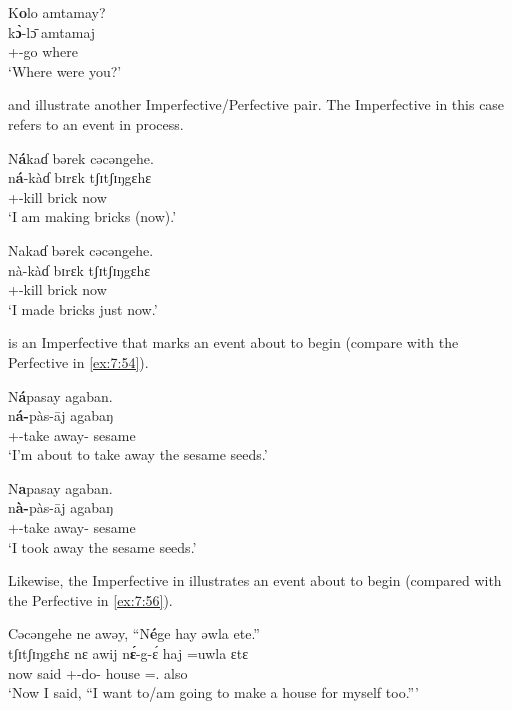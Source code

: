 \clearpage
\ea\label{ex:7:50}
K\textbf{o}lo  amtamay?\\
\gll k\textbf{\`ɔ}{}-l\=ɔ  amtamaj\\
{\twoS}+{\PFV}-go  where\\
\glt ‘Where were you?’
\z

 and  illustrate another Imperfective/Perfective pair. The Imperfective in this case refers to an event in process. 

\ea\label{ex:7:51}
N\textbf{á}kaɗ  bərek  cəcəngehe.\\
\gll n\textbf{á}-kàɗ  bɪrɛk  tʃɪtʃɪŋgɛhɛ\\
{\oneS}+{\IFV}-kill  brick  now\\
\glt ‘I am making bricks (now).’ 
\z

\ea\label{ex:7:52}
Nakaɗ  bərek  cəcəngehe.\\
\gll nà-kàɗ  bɪrɛk  tʃɪtʃɪŋgɛhɛ\\
{\oneS}+{\PFV}-kill  brick  now\\
\glt ‘I made bricks just now.’ 
\z

 is an Imperfective that marks an event about to begin (compare with the Perfective in \ref{ex:7:54}). 

\ea\label{ex:7:53} 
N\textbf{á}pasay  agaban.  \\
\gll n\textbf{á-}pàs-\={a}j agabaŋ  \\
{{\oneS}+{\IFV}-take away-{\CL}}  sesame\\
\glt ‘I’m about to take away the sesame seeds.’
\z

\ea\label{ex:7:54}
N\textbf{a}pasay agaban. \\ 
\gll n\textbf{à-}pàs-\={a}j  agabaŋ \\ 
{{\oneS}+{\PFV}-take away-{\CL}}  sesame\\
\glt ‘I took away the sesame seeds.’
\z

Likewise, the Imperfective in  illustrates an event about to begin (compared with the Perfective in \ref{ex:7:56}).

\ea\label{ex:7:55}
Cəcəngehe  ne awəy,  “N\textbf{é}ge  hay  əwla  ete.”\\
\gll tʃɪtʃɪŋgɛhɛ   nɛ  awij    n\textbf{\'ɛ}{}-g-\'ɛ     haj   =uwla     ɛtɛ\\
now    {\oneS}  said    {\oneS}+{\IFV}-do-{\CL}  house  ={\oneS}.{\POSS}  also\\
\glt ‘Now I said, “I want to/am going to make a house for myself too.”’
\z

